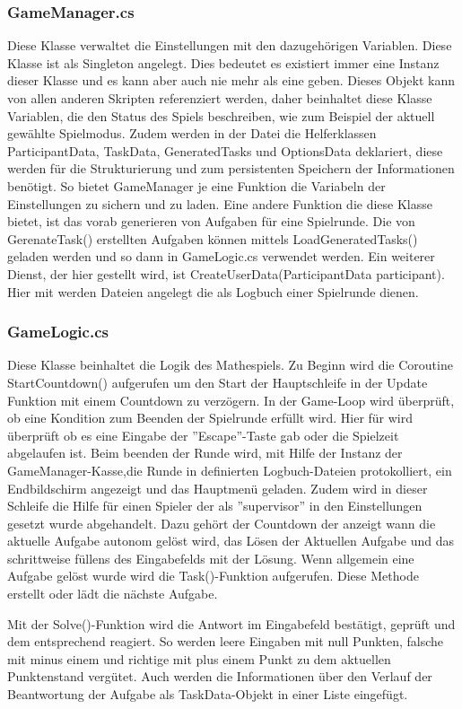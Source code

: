 \subsubsection{GameManager.cs}
Diese Klasse verwaltet die Einstellungen mit den dazugehörigen Variablen. Diese Klasse ist als Singleton angelegt. Dies bedeutet es existiert immer eine Instanz dieser Klasse und es kann aber auch nie mehr als eine geben. Dieses Objekt kann von allen anderen Skripten referenziert werden, daher beinhaltet diese Klasse Variablen, die den Status des Spiels beschreiben, wie zum Beispiel der aktuell gewählte Spielmodus. Zudem werden in der Datei die Helferklassen ParticipantData, TaskData, GeneratedTasks und OptionsData deklariert, diese werden für die Strukturierung und zum persistenten Speichern der Informationen benötigt. So bietet GameManager je eine Funktion die Variabeln der Einstellungen zu sichern und zu laden. 
Eine andere Funktion die diese Klasse bietet, ist das vorab generieren von Aufgaben für eine Spielrunde. Die von GerenateTask() erstellten Aufgaben können mittels LoadGeneratedTasks() geladen werden und so dann in GameLogic.cs verwendet werden.
Ein weiterer Dienst, der hier gestellt wird, ist CreateUserData(ParticipantData participant). Hier mit werden Dateien angelegt die als Logbuch einer Spielrunde dienen.

\subsubsection{GameLogic.cs}
Diese Klasse beinhaltet die Logik des Mathespiels. Zu Beginn wird die Coroutine StartCountdown() aufgerufen um den Start der Hauptschleife in der Update Funktion mit einem Countdown  zu verzögern. In der Game-Loop wird überprüft, ob eine Kondition zum Beenden der Spielrunde erfüllt wird. Hier für wird überprüft ob es eine Eingabe der ''Escape''-Taste gab oder die Spielzeit abgelaufen ist. Beim beenden der Runde wird, mit Hilfe der Instanz der GameManager-Kasse,die Runde in definierten Logbuch-Dateien protokolliert, ein Endbildschirm angezeigt und das Hauptmenü geladen. Zudem wird in dieser Schleife die Hilfe für einen Spieler der als ''supervisor'' in den Einstellungen gesetzt wurde abgehandelt. Dazu gehört der Countdown der anzeigt wann die aktuelle Aufgabe autonom gelöst wird, das Lösen der Aktuellen Aufgabe und das schrittweise füllens des Eingabefelds mit der Lösung. Wenn allgemein eine Aufgabe gelöst wurde wird die Task()-Funktion aufgerufen. Diese Methode erstellt oder lädt die nächste Aufgabe.\par
Mit der Solve()-Funktion wird die Antwort im Eingabefeld bestätigt, geprüft und dem entsprechend reagiert. So werden leere Eingaben  mit null Punkten, falsche mit minus einem und richtige mit plus einem Punkt zu dem aktuellen Punktenstand vergütet. Auch werden die Informationen über den Verlauf der Beantwortung der Aufgabe als TaskData-Objekt in einer Liste eingefügt.

